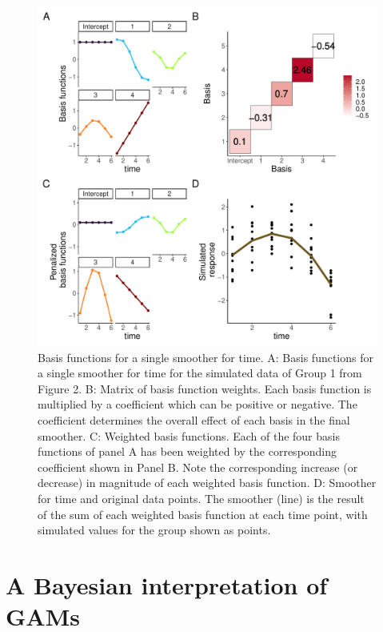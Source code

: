 \documentclass[
]{article}
\begin{document}
\begin{figure}

{\centering \includegraphics[width=0.75\linewidth]{Full_document_SIM_No_Appendix_files/figure-latex/basis-plot-1} 

}

\caption{Basis functions for a single smoother for time. A: Basis functions for a single smoother for time for the simulated data of Group 1 from Figure 2. B: Matrix of basis function weights. Each basis function is multiplied by a coefficient which can be positive or negative. The coefficient determines the overall effect of each basis in the final smoother. C: Weighted basis functions. Each of the four basis functions of panel A has been weighted by the corresponding coefficient shown in Panel B. Note the corresponding increase (or decrease) in magnitude of each weighted basis function. D: Smoother for time and original data points. The smoother (line) is the result of the sum of each weighted basis function at each time point, with simulated values for the group shown as points.}\label{fig:basis-plot}
\end{figure}

\hypertarget{a-bayesian-interpretation-of-gams}{%
\section{A Bayesian interpretation of GAMs}\label{a-bayesian-interpretation-of-gams}}
\end{document}
